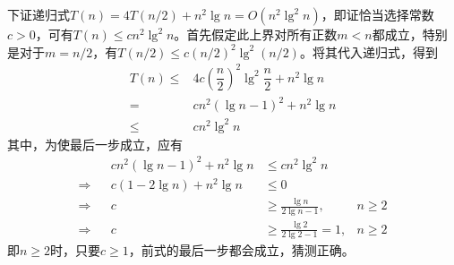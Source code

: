 \documentclass{article}
\begin{document}
下证递归式$T(n)=4T(n/2)+n^2\lg{n} = O(n^2\lg^2{n})$，即证恰当选择常数$c>0$，可有$T(n) \leq cn^2\lg^2{n}$。首先假定此上界对所有正数$m<n$都成立，特别是对于$m = n / 2$，有$T(n/2) \leq c (n/2)^2 \lg^2{(n/2)}$。将其代入递归式，得到
\begin{align*}
    T(n) \leq& 4c \left( \dfrac{n}{2} \right)^2 \lg^2{\dfrac{n}{2}} + n^2\lg{n}\\
    =& cn^2(\lg{n} - 1)^2 + n^2\lg{n}\\
    \leq& cn^2\lg^2{n}
\end{align*}
其中，为使最后一步成立，应有
\begin{align*}
    && cn^2(\lg{n} - 1)^2 + n^2\lg{n} &\leq cn^2\lg^2{n} & \\
    \Rightarrow && c(1 - 2\lg{n}) + n^2\lg{n} &\leq 0 & \\
    \Rightarrow && c &\geq \frac{\lg{n}}{2\lg{n} - 1}, & n \geq 2 \\
    \Rightarrow && c &\geq \frac{\lg{2}}{2\lg{2} - 1} = 1, & n \geq 2
\end{align*}
即$n \geq 2 $时，只要$c \geq 1$，前式的最后一步都会成立，猜测正确。
\FloatBarrier
\end{document}
